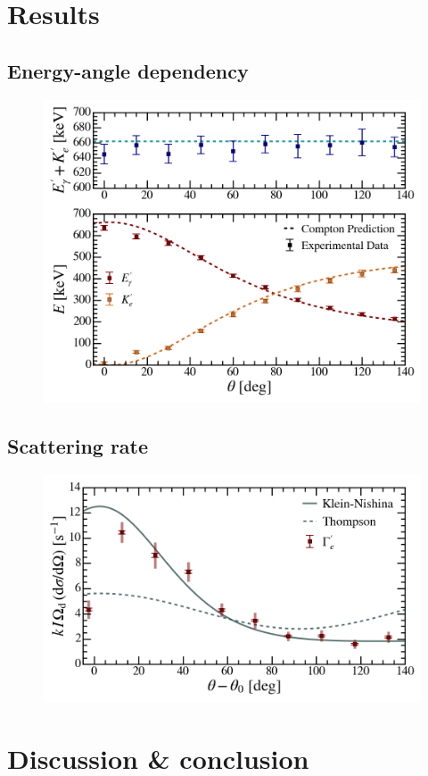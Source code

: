 \documentclass[aps,twocolumn,secnumarabic,balancelastpage,amsmath,amssymb,nofootinbib,floatfix]{revtex4-1}
\begin{document}
\section{Results}
\label{sec:result}

\subsection{Energy-angle dependency}
\label{ssec:energy_angle_dependency}

\begin{figure}
    \centering
    \includegraphics[width=0.49 \textwidth]{Figures/energy_angle_dependency.png}
    \caption{}
    \label{fig:energy_angle_dependency}
\end{figure}

\subsection{Scattering rate}
\label{ssec:scattering_rate}

\begin{figure}
    \centering
    \includegraphics[width=0.49 \textwidth]{Figures/scattering_rate.png}
    \caption{}
    \label{fig:scattering_rate}
\end{figure}




\section{Discussion \& conclusion}
\label{sec:conclusion}
\end{document}
